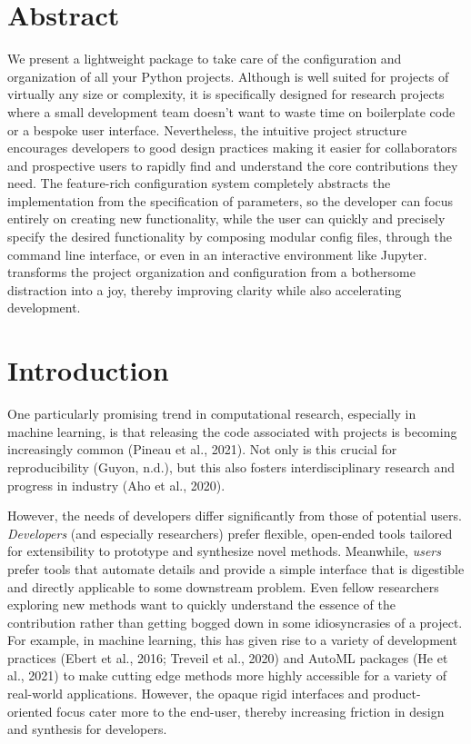 \documentclass[10pt,a4paper,onecolumn]{article}
\let\textttOrig=\texttt
\def\texttt#1{\expandafter\textttOrig{\seqsplit{#1}}}
\begin{document}
\hypertarget{abstract}{%
\section{Abstract}\label{abstract}}

We present a lightweight package to take care of the configuration and
organization of all your Python projects. Although \texttt{omni-fig} is
well suited for projects of virtually any size or complexity, it is
specifically designed for research projects where a small development
team doesn't want to waste time on boilerplate code or a bespoke user
interface. Nevertheless, the intuitive project structure encourages
developers to good design practices making it easier for collaborators
and prospective users to rapidly find and understand the core
contributions they need. The feature-rich configuration system
completely abstracts the implementation from the specification of
parameters, so the developer can focus entirely on creating new
functionality, while the user can quickly and precisely specify the
desired functionality by composing modular config files, through the
command line interface, or even in an interactive environment like
Jupyter. \texttt{omni-fig} transforms the project organization and
configuration from a bothersome distraction into a joy, thereby
improving clarity while also accelerating development.

\hypertarget{introduction}{%
\section{Introduction}\label{introduction}}

One particularly promising trend in computational research, especially
in machine learning, is that releasing the code associated with projects
is becoming increasingly common (Pineau et al., 2021). Not only is this
crucial for reproducibility (Guyon, n.d.), but this also fosters
interdisciplinary research and progress in industry (Aho et al., 2020).

However, the needs of developers differ significantly from those of
potential users. \emph{Developers} (and especially researchers) prefer
flexible, open-ended tools tailored for extensibility to prototype and
synthesize novel methods. Meanwhile, \emph{users} prefer tools that
automate details and provide a simple interface that is digestible and
directly applicable to some downstream problem. Even fellow researchers
exploring new methods want to quickly understand the essence of the
contribution rather than getting bogged down in some idiosyncrasies of a
project. For example, in machine learning, this has given rise to a
variety of development practices (Ebert et al., 2016; Treveil et al.,
2020) and AutoML packages (He et al., 2021) to make cutting edge methods
more highly accessible for a variety of real-world applications.
However, the opaque rigid interfaces and product-oriented focus cater
more to the end-user, thereby increasing friction in design and
synthesis for developers.
\end{document}

